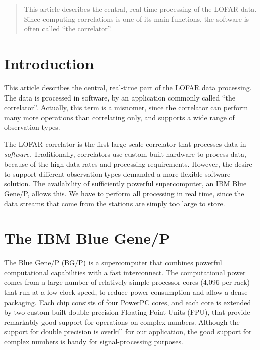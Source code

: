 \date{Received: date / Accepted: date}


\maketitle

\begin{abstract}
This article describes the central, real-time processing of the LOFAR data.
Since computing correlations is one of its main functions, the software is
often called ``the correlator''.


\end{abstract}

\section{Introduction}

This article describes the central, real-time part of the LOFAR data
processing.
The data is processed in software, by an application commonly called
``the correlator''.
Actually, this term is a misnomer, since the correlator can perform many
more operations than correlating only, and supports a wide range of
observation types.

The LOFAR correlator is the first large-scale correlator that processes
data in \emph{software}.
Traditionally, correlators use custom-built hardware to process data, because
of the high data rates and processing requirements.
However, the desire to support different observation types demanded a more
flexible software solution.
The availability of sufficiently powerful supercomputer, an IBM Blue Gene/P,
allows this.
We have to perform all processing in real time, since the data streams
that come from the stations are simply too large to store.



\section{The IBM Blue Gene/P}

The Blue Gene/P (BG/P) is a supercomputer that combines powerful computational
capabilities with a fast interconnect.
The computational power comes from a large number of relatively simple
processor cores (4,096 per rack) that run at a low clock speed, to reduce
power consumption and allow a dense packaging.
Each chip consists of four PowerPC cores, and each core is extended by
two custom-built double-precision Floating-Point Units (FPU), that provide
remarkably good support for operations on complex numbers.
Although the support for double precision is overkill for our application,
the good support for complex numbers is handy for signal-processing purposes.

